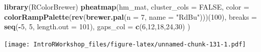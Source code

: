 \documentclass[
]{book}
\newenvironment{Shaded}{\begin{snugshade}}{\end{snugshade}}
\newcommand{\AttributeTok}[1]{\textcolor[rgb]{0.13,0.29,0.53}{#1}}
\newcommand{\ConstantTok}[1]{\textcolor[rgb]{0.56,0.35,0.01}{#1}}
\newcommand{\DecValTok}[1]{\textcolor[rgb]{0.00,0.00,0.81}{#1}}
\newcommand{\FunctionTok}[1]{\textcolor[rgb]{0.13,0.29,0.53}{\textbf{#1}}}
\newcommand{\NormalTok}[1]{#1}
\newcommand{\SpecialCharTok}[1]{\textcolor[rgb]{0.81,0.36,0.00}{\textbf{#1}}}
\newcommand{\StringTok}[1]{\textcolor[rgb]{0.31,0.60,0.02}{#1}}
\begin{document}
\begin{Shaded}
\begin{Highlighting}[]
\FunctionTok{library}\NormalTok{(RColorBrewer)}
\FunctionTok{pheatmap}\NormalTok{(hm\_mat,}
         \AttributeTok{cluster\_cols =} \ConstantTok{FALSE}\NormalTok{,}
         \AttributeTok{color =} \FunctionTok{colorRampPalette}\NormalTok{(}\FunctionTok{rev}\NormalTok{(}\FunctionTok{brewer.pal}\NormalTok{(}\AttributeTok{n =} \DecValTok{7}\NormalTok{, }\AttributeTok{name =} \StringTok{"RdBu"}\NormalTok{)))(}\DecValTok{100}\NormalTok{),}
         \AttributeTok{breaks =} \FunctionTok{seq}\NormalTok{(}\SpecialCharTok{{-}}\DecValTok{5}\NormalTok{, }\DecValTok{5}\NormalTok{, }\AttributeTok{length.out =} \DecValTok{101}\NormalTok{),}
         \AttributeTok{gaps\_col =} \FunctionTok{c}\NormalTok{(}\DecValTok{6}\NormalTok{,}\DecValTok{12}\NormalTok{,}\DecValTok{18}\NormalTok{,}\DecValTok{24}\NormalTok{,}\DecValTok{30}\NormalTok{)}
\NormalTok{)}
\end{Highlighting}
\end{Shaded}

\texttt{[image: IntroRWorkshop\_files/figure-latex/unnamed-chunk-131-1.pdf]}

  
\end{document}

